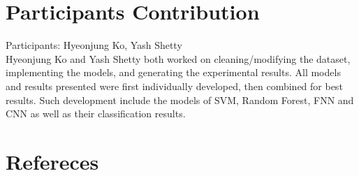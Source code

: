 \documentclass[11.5pt]{article}
\begin{document}
\section{Participants Contribution}
Participants: Hyeonjung Ko, Yash Shetty\\

Hyeonjung Ko and Yash Shetty both worked on cleaning/modifying the dataset, implementing the models, and generating the experimental results. All models and results presented were first individually developed, then combined for best results. Such development include the models of SVM, Random Forest, FNN and CNN as well as their classification results.

\section{Refereces}

​
​
​
\vspace{10mm}
​
\end{document}
